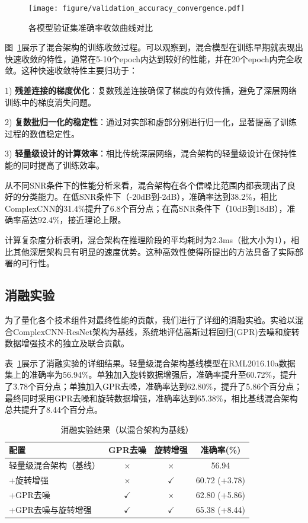 \documentclass[conference]{IEEEtran}
\begin{document}
\begin{figure}[htbp]
\centering
\texttt{[image: figure/validation\_accuracy\_convergence.pdf]}
\caption{各模型验证集准确率收敛曲线对比}
\label{fig:training_convergence}
\end{figure}

图~\ref{fig:training_convergence}展示了混合架构的训练收敛过程。可以观察到，混合模型在训练早期就表现出快速收敛的特性，通常在5-10个epoch内达到较好的性能，并在20个epoch内完全收敛。这种快速收敛特性主要归功于：

1) \textbf{残差连接的梯度优化}：复数残差连接确保了梯度的有效传播，避免了深层网络训练中的梯度消失问题。

2) \textbf{复数批归一化的稳定性}：通过对实部和虚部分别进行归一化，显著提高了训练过程的数值稳定性。

3) \textbf{轻量级设计的计算效率}：相比传统深层网络，混合架构的轻量级设计在保持性能的同时提高了训练效率。

从不同SNR条件下的性能分析来看，混合架构在各个信噪比范围内都表现出了良好的分类能力。在低SNR条件下（-20dB到-2dB），准确率达到38.2\%，相比ComplexCNN的31.4\%提升了6.8个百分点；在高SNR条件下（10dB到18dB），准确率高达92.4\%，接近理论上限。

计算复杂度分析表明，混合架构在推理阶段的平均耗时为2.3ms（批大小为1），相比其他深层架构具有明显的速度优势。这种高效性使得所提出的方法具备了实际部署的可行性。

\subsection{消融实验}

为了量化各个技术组件对最终性能的贡献，我们进行了详细的消融实验。实验以混合ComplexCNN-ResNet架构为基线，系统地评估高斯过程回归(GPR)去噪和旋转数据增强技术的独立及联合贡献。

表~\ref{tab:ablation_study}展示了消融实验的详细结果。轻量级混合架构基线模型在RML2016.10a数据集上的准确率为56.94\%。单独加入旋转数据增强后，准确率提升至60.72\%，提升了3.78个百分点；单独加入GPR去噪，准确率达到62.80\%，提升了5.86个百分点；最终同时采用GPR去噪和旋转数据增强，准确率达到65.38\%，相比基线混合架构总共提升了8.44个百分点。

\begin{table}[h]
\centering
\caption{消融实验结果（以混合架构为基线）}
\label{tab:ablation_study}
\begin{tabular}{@{}lccc@{}}
\toprule
配置 & GPR去噪 & 旋转增强 & 准确率(\%) \\
\midrule
轻量级混合架构（基线） & $\times$ & $\times$ & 56.94 \\
+旋转增强 & $\times$ & $\checkmark$ & 60.72 (+3.78) \\
+GPR去噪 & $\checkmark$ & $\times$ & 62.80 (+5.86) \\
+GPR去噪与旋转增强 & $\checkmark$ & $\checkmark$ & 65.38 (+8.44) \\
\bottomrule
\end{tabular}
\end{table}
\end{document}
